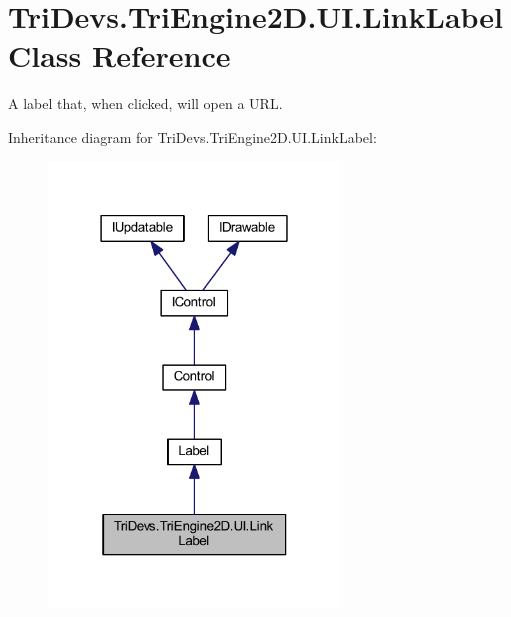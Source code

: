 \hypertarget{class_tri_devs_1_1_tri_engine2_d_1_1_u_i_1_1_link_label}{\section{Tri\-Devs.\-Tri\-Engine2\-D.\-U\-I.\-Link\-Label Class Reference}
\label{class_tri_devs_1_1_tri_engine2_d_1_1_u_i_1_1_link_label}
}


A label that, when clicked, will open a U\-R\-L.  




Inheritance diagram for Tri\-Devs.\-Tri\-Engine2\-D.\-U\-I.\-Link\-Label\-:\nopagebreak
\begin{figure}[H]
\begin{center}
\leavevmode
\includegraphics[width=219pt]{class_tri_devs_1_1_tri_engine2_d_1_1_u_i_1_1_link_label__inherit__graph}
\end{center}
\end{figure}


